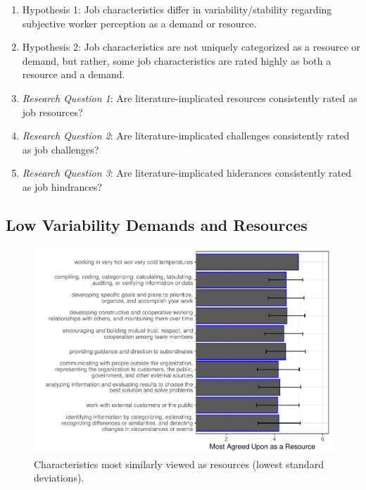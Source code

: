 \documentclass[
  man]{apa6}
\begin{document}
\begin{enumerate}
\def\labelenumi{\arabic{enumi}.}
\item
  Hypothesis 1: Job characteristics differ in variability/stability regarding subjective worker perception as a demand or resource.
\item
  Hypothesis 2: Job characteristics are not uniquely categorized as a resource or demand, but rather, some job characteristics are rated highly as both a resource and a demand.
\item
  \emph{Research Question 1}: Are literature-implicated resources consistently rated as job resources?
\item
  \emph{Research Question 2}: Are literature-implicated challenges consistently rated as job challenges?
\item
  \emph{Research Question 3}: Are literature-implicated hiderances consistently rated as job hindrances?
\end{enumerate}

\hypertarget{low-variability-demands-and-resources}{%
\subsection{Low Variability Demands and Resources}\label{low-variability-demands-and-resources}}

\begin{figure}
\centering
\includegraphics{Submission_files/figure-latex/resourcesagree-1.pdf}
\caption{\label{fig:resourcesagree}Characteristics most similarly viewed as resources (lowest standard deviations).}
\end{figure}
\end{document}
